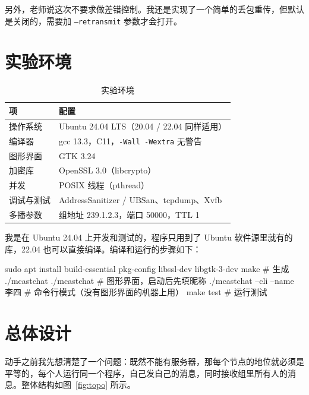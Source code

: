 \documentclass[a4paper,zihao=-4]{ctexart}
\newcommand{\inl}[1]{\texttt{#1}}
\begin{document}
另外，老师说这次不要求做差错控制。我还是实现了一个简单的丢包重传，但默认是关闭的，需要加 \inl{--retransmit} 参数才会打开。

\section{实验环境}

\begin{table}[H]
  \centering
  \caption{实验环境}
  \begin{tabularx}{0.85\linewidth}{lY}
    \toprule
    项 & 配置 \\
    \midrule
    操作系统 & Ubuntu 24.04 LTS（20.04 / 22.04 同样适用） \\
    编译器 & gcc 13.3，C11，\inl{-Wall -Wextra} 无警告 \\
    图形界面 & GTK 3.24 \\
    加密库 & OpenSSL 3.0（libcrypto） \\
    并发 & POSIX 线程（pthread） \\
    调试与测试 & AddressSanitizer / UBSan、tcpdump、Xvfb \\
    多播参数 & 组地址 239.1.2.3，端口 50000，TTL 1 \\
    \bottomrule
  \end{tabularx}
\end{table}

我是在 Ubuntu 24.04 上开发和测试的，程序只用到了 Ubuntu 软件源里就有的库，22.04 也可以直接编译。编译和运行的步骤如下：

\begin{code}
sudo apt install build-essential pkg-config libssl-dev libgtk-3-dev
make                           # 生成 ./mcastchat
./mcastchat                    # 图形界面，启动后先填昵称
./mcastchat --cli --name 李四  # 命令行模式（没有图形界面的机器上用）
make test                      # 运行测试
\end{code}

\section{总体设计}

动手之前我先想清楚了一个问题：既然不能有服务器，那每个节点的地位就必须是平等的，每个人运行同一个程序，自己发自己的消息，同时接收组里所有人的消息。整体结构如图~\ref{fig:topo} 所示。
\end{document}
